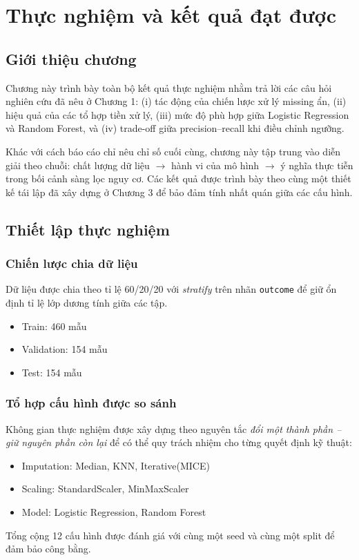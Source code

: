 \chapter{Thực nghiệm và kết quả đạt được}

\section{Giới thiệu chương}
Chương này trình bày toàn bộ kết quả thực nghiệm nhằm trả lời các câu hỏi nghiên cứu đã nêu ở Chương 1:
(i) tác động của chiến lược xử lý missing ẩn, (ii) hiệu quả của các tổ hợp tiền xử lý,
(iii) mức độ phù hợp giữa Logistic Regression và Random Forest, và (iv) trade-off giữa precision--recall khi điều chỉnh ngưỡng.

Khác với cách báo cáo chỉ nêu chỉ số cuối cùng, chương này tập trung vào diễn giải theo chuỗi:
chất lượng dữ liệu \(\rightarrow\) hành vi của mô hình \(\rightarrow\) ý nghĩa thực tiễn trong bối cảnh sàng lọc nguy cơ.
Các kết quả được trình bày theo cùng một thiết kế tái lập đã xây dựng ở Chương 3 để bảo đảm tính nhất quán giữa các cấu hình.

\section{Thiết lập thực nghiệm}
\subsection{Chiến lược chia dữ liệu}
Dữ liệu được chia theo tỉ lệ 60/20/20 với \textit{stratify} trên nhãn \texttt{outcome}
để giữ ổn định tỉ lệ lớp dương tính giữa các tập.
\begin{itemize}[leftmargin=1.5em]
    \item Train: 460 mẫu
    \item Validation: 154 mẫu
    \item Test: 154 mẫu
\end{itemize}

\subsection{Tổ hợp cấu hình được so sánh}
\noindent
Không gian thực nghiệm được xây dựng theo nguyên tắc \textit{đổi một thành phần -- giữ nguyên phần còn lại}
để có thể quy trách nhiệm cho từng quyết định kỹ thuật:
\begin{itemize}[leftmargin=1.5em]
    \item Imputation: Median, KNN, Iterative(MICE)
    \item Scaling: StandardScaler, MinMaxScaler
    \item Model: Logistic Regression, Random Forest
\end{itemize}
Tổng cộng 12 cấu hình được đánh giá với cùng một seed và cùng một split để đảm bảo công bằng.

